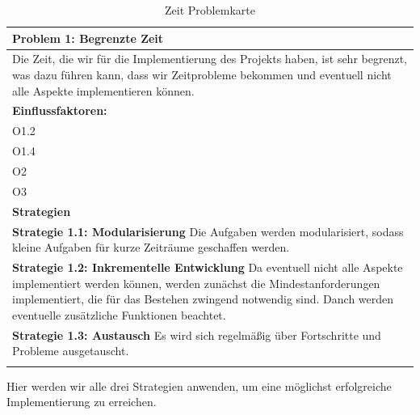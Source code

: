 \documentclass[fontsize=12pt,paper=a4,twoside]{scrartcl}
\begin{document}
\begin{table}[H]
    \centering
    \begin{tabular}{|p{15cm}|}
    \hline
          \textbf{Problem 1:} Begrenzte Zeit \\ \hline
         Die Zeit, die wir für die Implementierung des Projekts haben, ist sehr begrenzt, was dazu führen kann, dass wir Zeitprobleme bekommen und eventuell nicht alle Aspekte implementieren können. \\ \hline
          \textbf{Einflussfaktoren: } \\
		O1.2 \\
		O1.4 \\
		O2 \\
		O3 \\
          \hline
          \textbf{Strategien} \\ \hline
            {}          
           \label{strategie:1.1}     
          \textbf{Strategie 1.1: Modularisierung} Die Aufgaben werden modularisiert, sodass kleine Aufgaben für kurze Zeiträume geschaffen werden. \\        
  {}          
           \label{strategie:1.2}              
          \textbf{Strategie 1.2: Inkrementelle Entwicklung} Da eventuell nicht alle Aspekte implementiert werden können, werden zunächst die Mindestanforderungen implementiert, die für das Bestehen zwingend notwendig sind. Danch werden eventuelle zusätzliche Funktionen beachtet. \\
	 {}          
           \label{strategie:1.3}     
          \textbf{Strategie 1.3: Austausch} Es wird sich regelmäßig über Fortschritte und Probleme ausgetauscht. \\ 
	 \\ \hline
    \end{tabular}

    \caption{Zeit Problemkarte}
    \label{tab:ProblemKarte1}
\end{table}
Hier werden wir alle drei Strategien anwenden, um eine möglichst erfolgreiche Implementierung zu erreichen. \\
\end{document}
